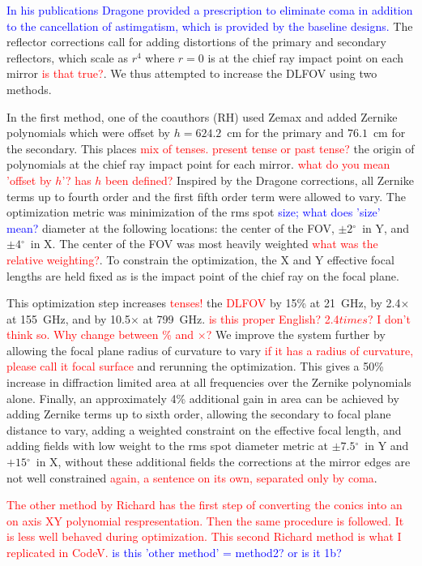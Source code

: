 \documentclass[]{spie}  %
\newcommand{\comr}[1]{\textcolor{red}{#1}}
\newcommand{\comb}[1]{\textcolor{blue}{#1}}
\newcommand{\dgr}{$^\circ$}
\begin{document}
\comb{In his publications Dragone provided a prescription to eliminate coma
in addition to the cancellation of astimgatism, which is provided by the baseline designs.} The reflector corrections 
call for adding distortions of the primary and secondary reflectors, 
which scale as $r^4$ where $r=0$ is at the chief ray impact point on each mirror \comr{is that true?}. 
We thus attempted to increase the DLFOV using two methods. 

In the first method, one of the coauthors (RH) used Zemax and added Zernike 
polynomials which were offset by $h=624.2$~cm for the primary and $76.1$~cm for the secondary.  
This places \comr{mix of tenses. present tense or past tense?} the origin of polynomials at the 
chief ray impact point for each mirror. \comr{what do you mean 'offset by $h$'? has $h$ been defined?}
Inspired by the Dragone corrections, all Zernike terms up to fourth order and the first fifth order term were allowed to vary. 
The optimization metric was minimization of the rms spot \comb{size; what does 'size' mean?} diameter at 
the following locations: the center of the FOV, $\pm2$\dgr\ in Y, and $\pm4$\dgr\ in X. The center of the FOV was 
most heavily weighted \comr{what was the relative weighting?}. To constrain the optimization, the X and Y 
effective focal lengths are held fixed as is the impact point of the chief ray on the focal plane. 

This optimization step increases \comr{tenses!} the \comr{DLFOV}
by 15\% at 21~GHz, by 2.4$\times$ at 155~GHz, and by 
10.5$\times$ at 799~GHz. \comr{is this proper English? 2.4$times$? I don't think so. Why change between \% and $\times$?} 
We improve the system further by allowing the focal plane radius of 
curvature to vary \comr{if it has a radius of curvature, please call it focal surface} and rerunning the optimization.  
This gives a 50\% increase in diffraction limited area at all frequencies over the Zernike polynomials alone.  
Finally, an approximately 4\% additional gain in area can be achieved by adding Zernike terms 
up to sixth order, allowing the secondary to focal plane distance to vary, adding a weighted constraint on the effective focal length, 
and adding fields with low weight to the rms spot diameter metric at $\pm7.5$\dgr\ in Y and $+15$\dgr\ in X, 
without these additional fields the 
corrections at the mirror edges are not well constrained \comr{again, a sentence on its own, separated only by coma}.

\comr{The other method by Richard has the first step of converting the conics into an on axis XY polynomial respresentation. Then the same procedure is followed.  It is less well behaved during optimization.  This second Richard method is what I replicated in CodeV.}
\comb{is this 'other method' = method2? or is it 1b?}
\end{document}

